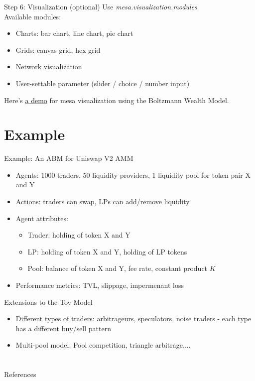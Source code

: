 \documentclass{beamer}
\begin{document}
\begin{frame}{Step 6: Visualization (optional)}
    Use \textit{mesa.visualization.modules}\\
    Available modules:
    \begin{itemize}
        \item Charts: bar chart, line chart, pie chart
        \item Grids: canvas grid, hex grid
        \item Network visualization
        \item User-settable parameter (slider / choice / number input)
    \end{itemize}
    \bigskip
    Here's \href{https://colab.research.google.com/github/projectmesa/mesa/blob/main/docs/tutorials/visualization_tutorial.ipynb}{\underline{a demo}} for mesa visualization using the Boltzmann Wealth Model.

\end{frame}


\section{Example}

\begin{frame}{Example: An ABM for Uniswap V2 AMM}
    \begin{itemize}
        \item Agents: 1000 traders, 50 liquidity providers, 1 liquidity pool for token pair X and Y
        \item Actions: traders can swap, LPs can add/remove liquidity
        \item Agent attributes:
              \begin{itemize}
                  \item Trader: holding of token X and Y
                  \item LP: holding of token X and Y, holding of LP tokens
                  \item Pool: balance of token X and Y, fee rate, constant product $K$
              \end{itemize}
        \item Performance metrics: TVL, slippage, impermenant loss
    \end{itemize}
\end{frame}

\begin{frame}{Extensions to the Toy Model}
    \begin{itemize}
        \item Different types of traders: arbitrageurs, speculators, noise traders - each type has a different buy/sell pattern
        \item Multi-pool model: Pool competition, triangle arbitrage,...
    \end{itemize}
\end{frame}

\section*{}

\begin{frame}[allowframebreaks]{References}
    \nocite{*}
    \printbibliography
\end{frame}
\end{document}
